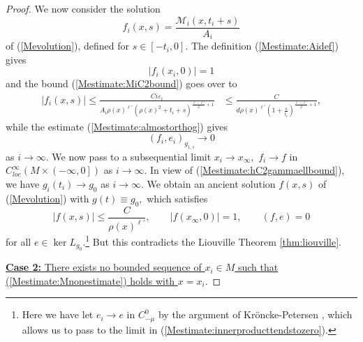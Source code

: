 \documentclass[12pt]{amsart}
\newcommand{\calM}{\mathcal{M}}
\newcommand{\LB}{\left[}
\newcommand{\RB}{\right]}
\renewcommand{\1}{{\mathbf 1}}
\newcommand{\eps}{{\varepsilon}}
\theoremstyle{others}
\numberwithin{equation}{section}
\begin{document}
\begin{proof}
    We now consider the solution
    $$f_i(x,s) = \frac{ \calM_i(x, t_i + s)}{A_i}$$
    of (\ref{Mevolution}), defined for $s \in \LB - t_i, 0 \RB.$ The definition (\ref{Mestimate:Aidef}) gives
    \begin{equation}
|f_i(x_i, 0)| = 1
    \end{equation}
    and the bound (\ref{Mestimate:MiC2bound}) goes over to
    \begin{equation}
    \begin{split}
        | f_i(x,s) | \leq \frac{C i \eps_i}{A_i \rho(x)^{\ell' }(\rho(x)^2 + t_i + s)^{\frac{\ell - \ell'}{2} + 1} } %
        & \leq \frac{C}{d \rho(x)^{\ell' } \left(1 + \frac{s}{t_i} \right)^{\frac{\ell - \ell'}{2} + 1} },
        \end{split}
    \end{equation}
    while the estimate (\ref{Mestimate:almostorthog}) gives
    \begin{equation}\label{Mestimate:innerproducttendstozero}
    \left( f_i, e_i \right)_{g_{1,i}} \to 0
    \end{equation}
    as $i \to \infty.$ We now pass to a subsequential limit $x_i \to x_\infty,$ $f_i \to f$ in $C^\infty_{loc}\left( M \times \left( -\infty, 0 \right] \right)$ as $i \to \infty.$ In view of (\ref{Mestimate:hC2gammaellbound}), we have $g_i(t_i) \to g_0$ as $i \to \infty.$ We obtain an ancient solution $f(x,s)$ of (\ref{Mevolution}) with $g(t) \equiv g_0,$ which satisfies
    \begin{equation}
        | f(x,s) | \leq \frac{C}{\rho(x)^{\ell'} }, \qquad |f(x_\infty, 0)| = 1, \qquad
    \left( f, e \right) = 0
    \end{equation}
    for all $e \in \ker L_{g_0}.$\footnote{Here we have let $e_i \to e$ in $C^0_{-\mu}$ %
    by the argument of Kr\"oncke-Petersen \cite[Prop. 2.3]{KronckePetersen20}, which allows us to pass to the limit in (\ref{Mestimate:innerproducttendstozero}).} But this contradicts the Liouville Theorem \ref{thm:liouville}.

\vspace{2mm}
    
\noindent   \underline{ {\bf Case 2:} There exists no bounded sequence of $x_i \in M$ such that (\ref{Mestimate:Mnonestimate}) holds with $x = x_i.$}


\end{proof}
\end{document}
